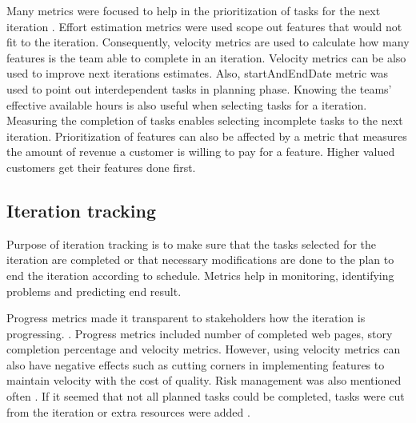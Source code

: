 \documentclass{sig-alternate}
\begin{document}
Many metrics were focused to help in the prioritization of tasks for the next
iteration \cite{Greening2010}\cite{Haugen200623}\cite{Hodgkins2007194}. Effort
estimation metrics were used scope out features that would not fit to the
iteration\cite{Elssamadisy2002617}.
Consequently, velocity metrics are used to calculate how many features is the
team able to complete in an iteration\cite{Polk2011263}. Velocity metrics can
be also used to improve next iterations estimates\cite{Mahnic201273}. Also,
startAndEndDate metric was used to point out interdependent tasks in planning
phase\cite{Hong2010310}. Knowing the teams' effective available hours is also
useful when selecting tasks for a iteration\cite{Cheng200929}. Measuring the
completion of tasks enables selecting incomplete tasks to the next
iteration\cite{Hong2010310}. Prioritization of features can also be affected
by a metric that measures the amount of revenue a customer is willing to pay
for a feature\cite{Hodgkins2007194}. Higher valued customers get their
features done first.
 

\subsection{Iteration tracking} %
\label{IterationTracking} 
Purpose of iteration tracking is to make sure that the tasks selected for the
iteration are completed or that necessary modifications are done to the plan to
end the iteration according to schedule.
Metrics help in monitoring, identifying problems and predicting end result.

Progress metrics made it transparent to stakeholders how the iteration is
progressing.
\cite{Petersen2011975}\cite{Talby2006100}\cite{Mahnic201273}
\cite{Dubinsky200512}\cite{Hong2010310}\cite{Green2011}
\cite{Trapa2006243}\cite{Trimble20134826}. Progress metrics included number of
completed web pages\cite{Hong2010310}, story completion
percentage\cite{Trapa2006243} and velocity metrics\cite{Dubinsky200512}.
However, using velocity metrics can also have negative effects such as cutting
corners in implementing features to maintain velocity with the cost of
quality\cite{Elssamadisy2002617}. Risk management was also mentioned often
\cite{Talby2006100}\cite{Trapa2006243}\cite{Dubinsky200512}\cite{Talby200940}.
If it seemed that not all planned tasks could be completed, tasks were cut from
the iteration \cite{Mahnic201273}\cite{Dubinsky200512}\cite{Middleton2007387} or
extra resources were added \cite{Dubinsky200512}\cite{Middleton2007387}.
\end{document}
